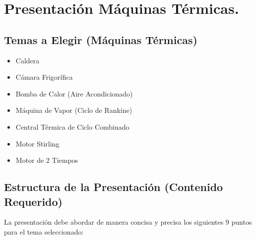 \documentclass[../main]{subfiles}
\begin{document}
\chapter{Presentación Máquinas Térmicas.}


\section*{Temas a Elegir (Máquinas Térmicas)}
\begin{itemize}
    \item Caldera
    \item Cámara Frigorífica
    \item Bomba de Calor (Aire Acondicionado)
    \item Máquina de Vapor (Ciclo de Rankine)
    \item Central Térmica de Ciclo Combinado
    \item Motor Stirling
    \item Motor de 2 Tiempos
\end{itemize}

\section*{Estructura de la Presentación (Contenido Requerido)}

La presentación debe abordar de manera concisa y precisa los siguientes 9 puntos para el tema seleccionado:
\end{document}
